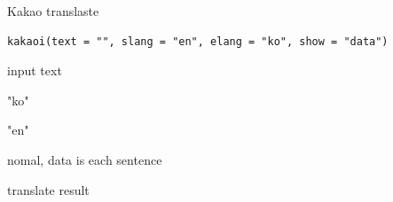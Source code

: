 \documentclass[a4paper]{book}
\begin{document}
%
\begin{Description}
Kakao translaste
\end{Description}
%
\begin{Usage}
\begin{verbatim}
kakaoi(text = "", slang = "en", elang = "ko", show = "data")
\end{verbatim}
\end{Usage}
%
\begin{Arguments}
\begin{ldescription}
\item[\code{text}] input text

\item[\code{slang}] "ko"

\item[\code{elang}] "en"

\item[\code{show}] nomal, data is each sentence
\end{ldescription}
\end{Arguments}
%
\begin{Value}
translate result
\end{Value}
\end{document}
